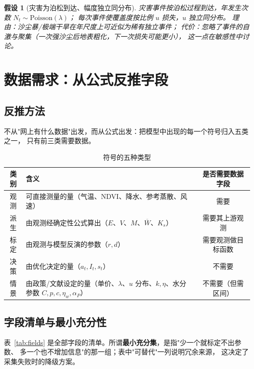 \documentclass[11pt,a4paper]{ctexart}
\newtheorem{assumption}{假设}
\begin{document}
\begin{assumption}[灾害为泊松到达、幅度独立同分布]\label{as:poisson}
灾害事件按泊松过程到达，年发生次数 $N_t\sim\mathrm{Poisson}(\lambda)$；
每次事件使覆盖度按比例 $u$ 损失，$u$ 独立同分布。
\emph{理由}：沙尘暴/极端干旱在年尺度上可近似为稀有独立事件；
\emph{代价}：忽略了事件的自激与聚集（一次强沙尘后地表粗化，下一次损失可能更小），
这一点在敏感性中讨论。
\end{assumption}

\section{数据需求：从公式反推字段}\label{sec:data}

\subsection{反推方法}

不从"网上有什么数据"出发，而从公式出发：把模型中出现的每一个符号归入五类之一，
只有前三类需要数据。

\begin{table}[H]\centering\small
\begin{tabularx}{\textwidth}{|c|X|c|}
\toprule
类别 & 含义 & 是否需要数据字段 \\
\midrule
观测 & 可直接测量的量（气温、NDVI、降水、参考蒸散、风速） & 需要 \\
派生 & 由观测经确定性公式算出（$E$、$V$、$M$、$\overline W$、$K_s$） & 需要其上游观测 \\
标定 & 由观测与模型反演的参数（$r,d$） & 需要观测做目标函数 \\
决策 & 由优化决定的量（$a_t,I_t,s_t$） & 不需要 \\
情景 & 由政策/文献设定的量（单价、$\lambda$、$u$ 分布、$k,\eta$、水分参数 $C,p,c,\eta_w,\alpha_P$） & 不需要（但需区间） \\
\bottomrule
\end{tabularx}
\caption{符号的五种类型}\label{tab:five}
\end{table}

\subsection{字段清单与最小充分性}

表~\ref{tab:fields} 是全部字段的清单。所谓\textbf{最小充分集}，是指"少一个就标定不出参数、
多一个也不增加信息"的那一组；表中"可替代"一列说明冗余来源，
这决定了采集失败时的降级方案。
\end{document}
